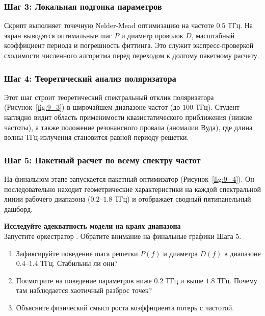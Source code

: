 
\subsubsection{Шаг 3: Локальная подгонка параметров}
Скрипт выполняет точечную Nelder-Mead оптимизацию на частоте $0.5$ ТГц. На экран выводятся оптимальные шаг $P$ и диаметр проволок $D$, масштабный коэффициент периода и погрешность фиттинга. Это служит экспресс-проверкой сходимости численного алгоритма перед переходом к долгому пакетному расчету.

\subsubsection{Шаг 4: Теоретический анализ поляризатора}
Этот шаг строит теоретический спектральный отклик поляризатора (Рисунок~\ref{fig:9_3}) в широчайшем диапазоне частот (до $100$ ТГц). Студент наглядно видит область применимости квазистатического приближения (низкие частоты), а также положение резонансного провала (аномалии Вуда), где длина волны ТГц-излучения становится равной периоду решетки.


\subsubsection{Шаг 5: Пакетный расчет по всему спектру частот}
На финальном этапе запускается пакетный оптимизатор (Рисунок~\ref{fig:9_4}). Он последовательно находит геометрические характеристики на каждой спектральной линии рабочего диапазона ($0.2$--$1.8$ ТГц) и отображает сводный пятипанельный дашборд.


\begin{minitaskbox}
    \textbf{Исследуйте адекватность модели на краях диапазона} \\
    Запустите оркестратор . Обратите внимание на финальные графики Шага 5.
    \begin{enumerate}
        \item Зафиксируйте поведение шага решетки $P(f)$ и диаметра $D(f)$ в диапазоне $0.4$--$1.4$ ТГц. Стабильны ли они?
        \item Посмотрите на поведение параметров ниже $0.2$ ТГц и выше $1.8$ ТГц. Почему там наблюдается хаотичный разброс точек?
        \item Объясните физический смысл роста коэффициента потерь с частотой.
    \end{enumerate}
\end{minitaskbox}

